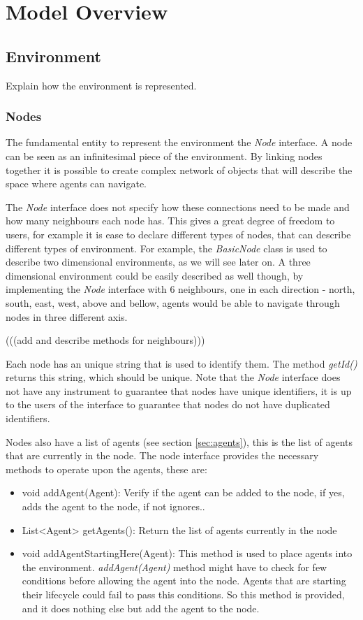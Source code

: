 
\chapter{Model Overview}
\label{ch:model-overview}

\section{Environment}

Explain how the environment is represented.

\subsection{Nodes}

The fundamental entity to represent the environment the \emph{Node} interface. A node can be seen as an infinitesimal piece of the environment. By linking nodes together it is possible to create complex network of objects that will describe the space where agents can navigate.

The \emph{Node} interface does not specify how these connections need to be made and how many neighbours each node has. This gives a great degree of freedom to users, for example it is ease to declare different types of nodes, that can describe different types of environment. For example, the \emph{BasicNode} class is used to describe two dimensional environments, as we will see later on. A three dimensional environment could be easily described as well though, by implementing the \emph{Node} interface with 6 neighbours, one in each direction - north, south, east, west, above and bellow, agents would be able to navigate through nodes in three different axis.

(((add and describe methods for neighbours)))

Each node has an unique string that is used to identify them. The method \emph{getId()} returns this string, which should be unique. Note that the \emph{Node} interface does not have any instrument to guarantee that nodes have unique identifiers, it is up to the users of the interface to guarantee that nodes do not have duplicated identifiers. 

Nodes also have a list of agents (see section \ref{sec:agents}), this is the list of agents that are currently in the node. The node interface provides the necessary methods to operate upon the agents, these are:

\begin{itemize}
  \item void addAgent(Agent): Verify if the agent can be added to the node, if yes, adds the agent to the node, if not ignores..
  \item List<Agent> getAgents(): Return the list of agents currently in the node
  \item void addAgentStartingHere(Agent): This method is used to place agents into the environment. \emph{addAgent(Agent)} method might have to check for few conditions before allowing the agent into the node. Agents that are starting their lifecycle could fail to pass this conditions. So this method is provided, and it does nothing else but add the agent to the node.
\end{itemize}

